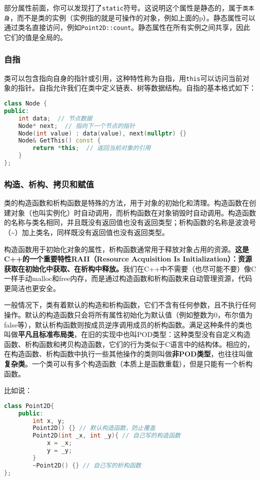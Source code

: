 部分属性前面，你可以发现打了\texttt{static}符号。这说明这个属性是静态的，属于\texttt{类本身}，而不是类的实例（实例指的就是可操作的对象，例如上面的p）。静态属性可以通过类名直接访问，例如\texttt{Point2D::count}。静态属性在所有实例之间共享，因此它们的值是全局的。

\subsubsection{自指}

类可以包含指向自身的指针或引用，这种特性称为自指，用\texttt{this}可以访问当前对象的指针。自指允许我们在类中定义链表、树等数据结构。自指的基本格式如下：
\begin{lstlisting}[language=C++]
class Node {
public:
    int data;  // 节点数据
    Node* next;  // 指向下一个节点的指针
    Node(int value) : data(value), next(nullptr) {}
    Node& GetThis() const {
        return *this;  // 返回当前对象的引用
    }
};
\end{lstlisting}

\subsubsection{构造、析构、拷贝和赋值}

类的构造函数和析构函数是特殊的方法，用于对象的初始化和清理。构造函数在创建对象（也叫实例化）时自动调用，而析构函数在对象销毁时自动调用。构造函数的名称与类名相同，并且既没有返回值也没有返回类型；析构函数的名称是波浪号（\textasciitilde）加上类名，同样既没有返回值也没有返回类型。

构造函数用于初始化对象的属性，析构函数通常用于释放对象占用的资源。\textbf{这是C++的一个重要特性RAII（Resource Acquisition Is Initialization）：资源获取在初始化中获取、在析构中释放。}我们在C++中不需要（也尽可能不要）像C一样手动malloc和free内存，而是通过构造函数和析构函数来自动管理资源，代码更简洁也更安全。

一般情况下，类有着默认的构造和析构函数，它们不含有任何参数，且不执行任何操作。默认的构造函数只会将所有属性初始化为默认值（例如整数为0，布尔值为false等），默认析构函数则按成员逆序调用成员的析构函数。满足这种条件的类也叫做\textbf{平凡且标准布局类}，在旧的实现中也叫POD类型：这种类型没有自定义构造函数、析构函数和拷贝构造函数，它们的行为类似于C语言中的结构体。相应的，在构造函数、析构函数中执行一些其他操作的类则叫做\textbf{非POD类型}，也往往叫做\textbf{复杂类}。一个类可以有多个构造函数（本质上是函数重载），但是只能有一个析构函数。

比如说：
\begin{lstlisting}[language=C++]
class Point2D{
    public:
        int x, y;
        Point2D() {} // 默认构造函数，防止覆盖
        Point2D(int _x, int _y){ // 自己写的构造函数
            x = _x;
            y = _y;
        }
        ~Point2D() {} // 自己写的析构函数
};
\end{lstlisting}

